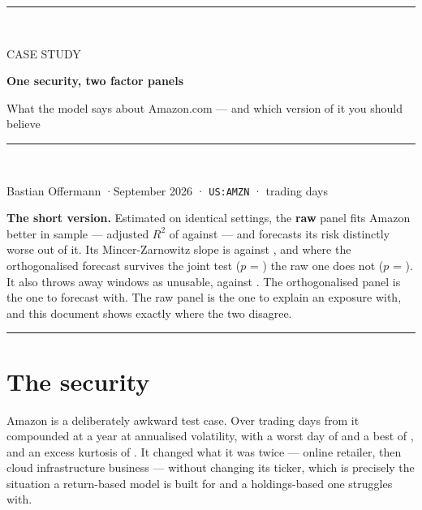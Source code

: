 \documentclass[11pt,a4paper]{article}
\newcommand{\code}[1]{\texttt{\small #1}}
\newcommand{\rawp}{\textcolor{brick}{\textbf{raw}}}
\newenvironment{takeaway}
  {\par\vspace{1.4ex}%
   \begin{lrbox}{\takeawaybox}\begin{minipage}{\dimexpr\textwidth-2.2em\relax}%
   \vspace{0.9ex}\hspace{0.4em}\begin{minipage}{\dimexpr\textwidth-3.4em\relax}
   \small\sffamily\color{ink}}
  {\end{minipage}\vspace{0.9ex}%
   \end{minipage}\end{lrbox}%
   \noindent\colorbox{paper}{%
     \textcolor{navy}{\rule{2.2pt}{\dimexpr\ht\takeawaybox+\dp\takeawaybox\relax}}%
     \usebox{\takeawaybox}}\par\vspace{1.6ex}}
\begin{document}
\thispagestyle{empty}
\vspace*{0.4cm}
{\raggedright
{\color{rule}\rule{\textwidth}{0.8pt}}\\[1.8ex]
{\sffamily\footnotesize\color{brick}\MakeUppercase{Case study}\par}
\vspace{0.8ex}
{\sffamily\LARGE\bfseries\color{navy} One security, two factor panels\par}
\vspace{1.0ex}
{\sffamily\large\color{ink} What the model says about Amazon.com --- and which
version of it you should believe\par}
\vspace{1.6ex}
{\color{rule}\rule{\textwidth}{0.8pt}}\\[1.8ex]
{\small Bastian Offermann \quad·\quad September 2026 \quad·\quad
 \code{US:AMZN} \quad·\quad \amzDays{} trading days\par}
}

\vspace{2.4ex}

\begin{takeaway}
\textbf{The short version.} Estimated on identical settings, the \rawp{} panel fits
Amazon better in sample --- adjusted $R^2$ of \adjRR{} against \adjRO{} --- and
forecasts its risk distinctly worse out of it. Its Mincer-Zarnowitz slope is
\mzbR{} against \mzbO{}, and where the orthogonalised forecast survives the joint
test ($p$ = \mzpO{}) the raw one does not ($p$ = \mzpR{}). It also throws away
\exclR{} windows as unusable, against \exclO{}. The orthogonalised panel is the one
to forecast with. The raw panel is the one to explain an exposure with, and this
document shows exactly where the two disagree.
\end{takeaway}

\section{The security}

Amazon is a deliberately awkward test case. Over \amzDays{} trading days from
\amzFirst{} it compounded at \amzRet{} a year at \amzVol{} annualised volatility,
with a worst day of \amzWorst{} and a best of \amzBest{}, and an excess kurtosis of
\amzKurt{}. It changed what it was twice --- online retailer, then cloud
infrastructure business --- without changing its ticker, which is precisely the
situation a return-based model is built for and a holdings-based one struggles
with.
\end{document}
